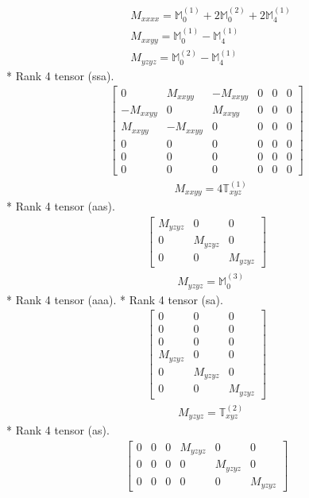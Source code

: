 \documentclass[fleqn,8pt,landscape]{jsarticle}
\begin{document}
\begin{align*}
& M_{xxxx} = \mathbb{M}_{0}^{(1)} + 2 \mathbb{M}_{0}^{(2)} + 2 \mathbb{M}_{4}^{(1)} \\
& M_{xxyy} = \mathbb{M}_{0}^{(1)} - \mathbb{M}_{4}^{(1)} \\
& M_{yzyz} = \mathbb{M}_{0}^{(2)} - \mathbb{M}_{4}^{(1)}
\end{align*}
* Rank 4 tensor (ssa).
\begin{align*}
\begin{bmatrix} 0 & M_{xxyy} & - M_{xxyy} & 0 & 0 & 0 \\ - M_{xxyy} & 0 & M_{xxyy} & 0 & 0 & 0 \\ M_{xxyy} & - M_{xxyy} & 0 & 0 & 0 & 0 \\ 0 & 0 & 0 & 0 & 0 & 0 \\ 0 & 0 & 0 & 0 & 0 & 0 \\ 0 & 0 & 0 & 0 & 0 & 0 \end{bmatrix}
\end{align*}
\begin{align*}
& M_{xxyy} = 4 \mathbb{T}_{xyz}^{(1)}
\end{align*}
* Rank 4 tensor (aas).
\begin{align*}
\begin{bmatrix} M_{yzyz} & 0 & 0 \\ 0 & M_{yzyz} & 0 \\ 0 & 0 & M_{yzyz} \end{bmatrix}
\end{align*}
\begin{align*}
& M_{yzyz} = \mathbb{M}_{0}^{(3)}
\end{align*}
* Rank 4 tensor (aaa).
* Rank 4 tensor (sa).
\begin{align*}
\begin{bmatrix} 0 & 0 & 0 \\ 0 & 0 & 0 \\ 0 & 0 & 0 \\ M_{yzyz} & 0 & 0 \\ 0 & M_{yzyz} & 0 \\ 0 & 0 & M_{yzyz} \end{bmatrix}
\end{align*}
\begin{align*}
& M_{yzyz} = \mathbb{T}_{xyz}^{(2)}
\end{align*}
* Rank 4 tensor (as).
\begin{align*}
\begin{bmatrix} 0 & 0 & 0 & M_{yzyz} & 0 & 0 \\ 0 & 0 & 0 & 0 & M_{yzyz} & 0 \\ 0 & 0 & 0 & 0 & 0 & M_{yzyz} \end{bmatrix}
\end{align*}
\end{document}
